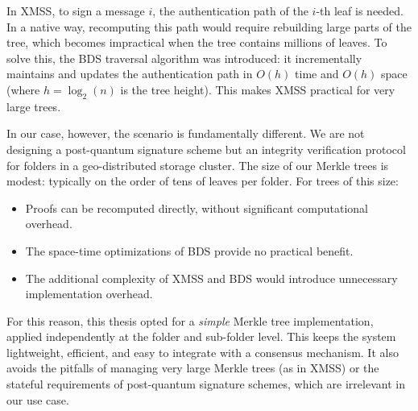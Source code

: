 In XMSS, to sign a message $i$, the authentication path of the $i$-th leaf is needed. In a native way, recomputing this path would require rebuilding large parts of the tree, which becomes impractical when the tree contains millions of leaves. To solve this, the BDS traversal algorithm was introduced: it incrementally maintains and updates the authentication path in $O(h)$ time and $O(h)$ space (where $h = \log_2(n)$ is the tree height). This makes XMSS practical for very large trees.

In our case, however, the scenario is fundamentally different. We are not
designing a post-quantum signature scheme but an integrity verification protocol
for folders in a geo-distributed storage cluster. The size of our Merkle trees is modest: typically on the order of tens of leaves per folder. For trees of this size:
\begin{itemize}
    \item Proofs can be recomputed directly, without significant computational overhead.
    \item The space-time optimizations of BDS provide no practical benefit.
    \item The additional complexity of XMSS and BDS would introduce unnecessary implementation overhead.
\end{itemize}

For this reason, this thesis opted for a \emph{simple} Merkle tree implementation, applied independently at the folder and sub-folder level. This keeps the system lightweight, efficient, and easy to integrate with a consensus mechanism. It also avoids the pitfalls of managing very large Merkle trees (as in XMSS) or the stateful requirements of post-quantum signature schemes, which are irrelevant in our use case.

